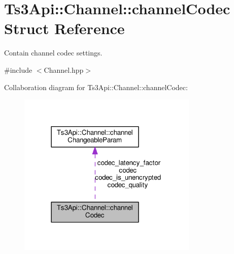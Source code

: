 \hypertarget{struct_ts3_api_1_1_channel_1_1channel_codec}{}\section{Ts3\+Api\+:\+:Channel\+:\+:channel\+Codec Struct Reference}
\label{struct_ts3_api_1_1_channel_1_1channel_codec}


Contain channel codec settings.  




{\ttfamily \#include $<$Channel.\+hpp$>$}



Collaboration diagram for Ts3\+Api\+:\+:Channel\+:\+:channel\+Codec\+:\nopagebreak
\begin{figure}[H]
\begin{center}
\leavevmode
\includegraphics[width=243pt]{struct_ts3_api_1_1_channel_1_1channel_codec__coll__graph}
\end{center}
\end{figure}
